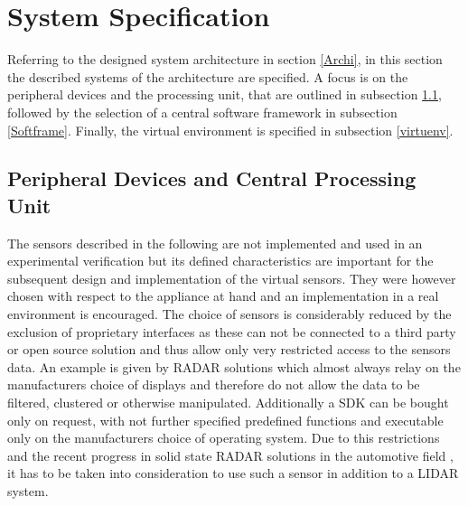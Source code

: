 \section{System Specification} \label{Spec}
Referring to the designed system architecture in section \ref{Archi}, in this section the described systems of the architecture are specified. A focus is on the peripheral devices and the processing unit, that are outlined in subsection \ref{PeriDev}, followed by the selection of a central software framework in subsection \ref{Softframe}. Finally, the virtual environment is specified in subsection \ref{virtuenv}.

\subsection{Peripheral Devices and Central Processing Unit} \label{PeriDev}
The sensors described in the following are not implemented and used in an experimental verification but its defined characteristics are important for the subsequent design and implementation of the virtual sensors. They were however chosen with respect to the appliance at hand and an implementation in a real environment is encouraged. The choice of sensors is considerably reduced by the exclusion of proprietary interfaces as these can not be connected to a third party or open source solution and thus allow only very restricted access to the sensors data. An example is given by \ac{RADAR} solutions which almost always relay on the manufacturers choice of displays and therefore do not allow the data to be filtered, clustered or otherwise manipulated. Additionally a \ac{SDK} can be bought only on request, with not further specified predefined functions and executable only on the manufacturers choice of operating system. Due to this restrictions and the recent progress in solid state \ac{RADAR} solutions in the automotive field \cite{ResRADAR}, it has to be taken into consideration to use such a sensor in addition to a \ac{LIDAR} system.\\

